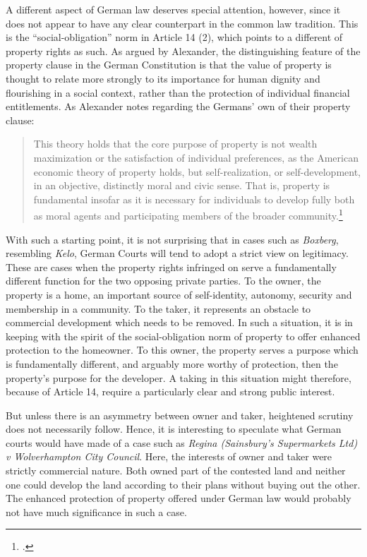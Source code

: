 A different aspect of German law deserves special attention, however, since it does not appear to have any clear counterpart in the common law tradition. This is the  ``social-obligation'' norm in Article 14 (2), which points to a different  of property rights as such. As argued by Alexander, the distinguishing feature of the property clause in the German Constitution is that the value of property is thought to relate more strongly to its importance for human dignity and flourishing in a social context, rather than the protection of individual financial entitlements. As Alexander notes regarding the Germans' own  of their property clause:

\begin{quote}
This theory holds that the core purpose of property is not wealth maximization or the satisfaction of individual preferences, as the American economic theory of property holds, but self-realization, or self-development, in an objective, distinctly moral and civic sense. That is, property is fundamental insofar as it is necessary for individuals to develop fully both
as moral agents and participating members of the broader community.\footcite[745]{alexander03}
\end{quote}

With such a starting point, it is not surprising that in cases such as {\it Boxberg}, resembling {\it Kelo}, German Courts will tend to adopt a strict view on legitimacy. These are cases when the property rights infringed on serve a fundamentally different function for the two opposing private parties. To the owner, the property is a home, an important source of self-identity, autonomy, security and membership in a community. To the taker, it represents an obstacle to commercial development which needs to be removed. In such a situation, it is in keeping with the spirit of the social-obligation norm of property to offer enhanced protection to the homeowner. To this owner, the property serves a purpose which is fundamentally different, and arguably more worthy of protection, then the property's purpose for the developer. A taking in this situation might therefore, because of Article 14, require a particularly clear and strong public interest.

But unless there is an asymmetry between owner and taker, heightened scrutiny does not necessarily follow. Hence, it is interesting to speculate what German courts would have made of a case such as {\it Regina (Sainsbury’s Supermarkets Ltd) v Wolverhampton City Council}. Here, the interests of owner and taker were strictly commercial nature. Both owned part of the contested land and neither one could develop the land according to their plans without buying out the other. The enhanced protection of property offered under German law would probably not have much significance in such a case. 

